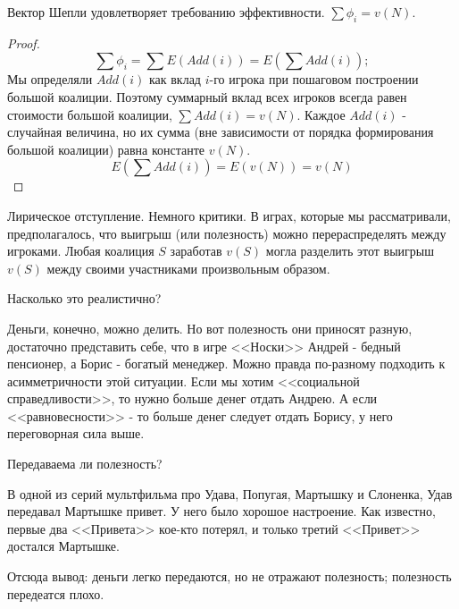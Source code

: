 \begin{myth} Вектор Шепли удовлетворяет требованию эффективности. $\sum \phi_{i}=v(N)$.
\end{myth}
\begin{proof}
$$\sum \phi_{i}=\sum E(Add(i))=E (\sum Add(i));$$
Мы определяли $Add(i)$ как вклад $i$-го игрока при пошаговом построении большой коалиции. Поэтому суммарный вклад всех игроков всегда равен стоимости большой коалиции, $\sum Add(i)=v(N)$. Каждое $Add(i)$ - случайная величина, но их сумма (вне зависимости от порядка формирования большой коалиции) равна константе $v(N)$.
$$E(\sum Add(i))=E(v(N))=v(N)$$
\end{proof}

Лирическое отступление. Немного критики. В играх, которые мы рассматривали, предполагалось, что выигрыш (или полезность) можно перераспределять между игроками. Любая коалиция $S$ заработав $v(S)$ могла разделить этот выигрыш $v(S)$ между своими участниками произвольным образом. 

Насколько это реалистично? 

Деньги, конечно, можно делить. Но вот полезность они приносят разную, достаточно представить себе, что в игре <<Носки>> Андрей - бедный пенсионер, а Борис - богатый менеджер. Можно правда по-разному подходить к асимметричности этой ситуации. Если мы хотим <<социальной справедливости>>, то нужно больше денег отдать Андрею. А если <<равновесности>> - то больше денег следует отдать Борису, у него переговорная сила выше.

Передаваема ли полезность? 

В одной из серий мультфильма про Удава, Попугая, Мартышку и Слоненка, Удав передавал Мартышке привет. У него было хорошое настроение. Как известно, первые два <<Привета>> кое-кто потерял, и только третий <<Привет>> достался Мартышке.

Отсюда вывод: деньги легко передаются, но не отражают полезность; полезность передеатся плохо.



